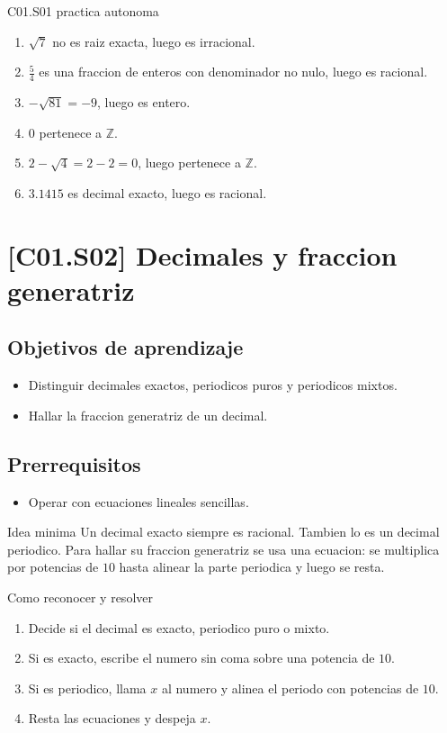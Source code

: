 \begin{fullsolution}{C01.S01 practica autonoma}
\begin{enumerate}[label=\textbf{PX-C01.S01-\arabic*:}, leftmargin=*]
  \item \(\sqrt{7}\) no es raiz exacta, luego es irracional.
  \item \(\frac{5}{4}\) es una fraccion de enteros con denominador no nulo, luego es racional.
  \item \(-\sqrt{81}=-9\), luego es entero.
  \item \(0\) pertenece a \(\mathbb{Z}\).
  \item \(2-\sqrt{4}=2-2=0\), luego pertenece a \(\mathbb{Z}\).
  \item \(3.1415\) es decimal exacto, luego es racional.
\end{enumerate}
\end{fullsolution}

\section{[C01.S02] Decimales y fraccion generatriz}

\subsection*{Objetivos de aprendizaje}
\begin{itemize}
  \item Distinguir decimales exactos, periodicos puros y periodicos mixtos.
  \item Hallar la fraccion generatriz de un decimal.
\end{itemize}

\subsection*{Prerrequisitos}
\begin{itemize}
  \item Operar con ecuaciones lineales sencillas.
\end{itemize}

\begin{theorybox}{Idea minima}
Un decimal exacto siempre es racional. Tambien lo es un decimal periodico. Para hallar su
fraccion generatriz se usa una ecuacion: se multiplica por potencias de \(10\) hasta alinear la
parte periodica y luego se resta.
\end{theorybox}

\begin{methodbox}{Como reconocer y resolver}
\begin{enumerate}
  \item Decide si el decimal es exacto, periodico puro o mixto.
  \item Si es exacto, escribe el numero sin coma sobre una potencia de \(10\).
  \item Si es periodico, llama \(x\) al numero y alinea el periodo con potencias de \(10\).
  \item Resta las ecuaciones y despeja \(x\).
\end{enumerate}
\end{methodbox}

